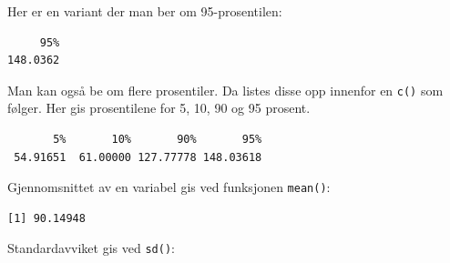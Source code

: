 \documentclass[
  norsk,
  letterpaper,
  DIV=11,
  numbers=noendperiod]{scrreprt}
\newenvironment{Shaded}{\begin{snugshade}}{\end{snugshade}}
\newcommand{\AttributeTok}[1]{\textcolor[rgb]{0.40,0.45,0.13}{#1}}
\newcommand{\ConstantTok}[1]{\textcolor[rgb]{0.56,0.35,0.01}{#1}}
\newcommand{\DecValTok}[1]{\textcolor[rgb]{0.68,0.00,0.00}{#1}}
\newcommand{\FunctionTok}[1]{\textcolor[rgb]{0.28,0.35,0.67}{#1}}
\newcommand{\NormalTok}[1]{\textcolor[rgb]{0.00,0.23,0.31}{#1}}
\newcommand{\SpecialCharTok}[1]{\textcolor[rgb]{0.37,0.37,0.37}{#1}}
\theoremstyle{definition}
\theoremstyle{remark}
\begin{document}
Her er en variant der man ber om 95-prosentilen:

\begin{Shaded}
\end{Shaded}

\begin{verbatim}
     95% 
148.0362 
\end{verbatim}

Man kan også be om flere prosentiler. Da listes disse opp innenfor en
\texttt{c()} som følger. Her gis prosentilene for 5, 10, 90 og 95
prosent.

\begin{Shaded}
\end{Shaded}

\begin{verbatim}
       5%       10%       90%       95% 
 54.91651  61.00000 127.77778 148.03618 
\end{verbatim}

Gjennomsnittet av en variabel gis ved funksjonen \texttt{mean()}:

\begin{Shaded}
\end{Shaded}

\begin{verbatim}
[1] 90.14948
\end{verbatim}

Standardavviket gis ved \texttt{sd()}:

\begin{Shaded}
\end{Shaded}
\end{document}
